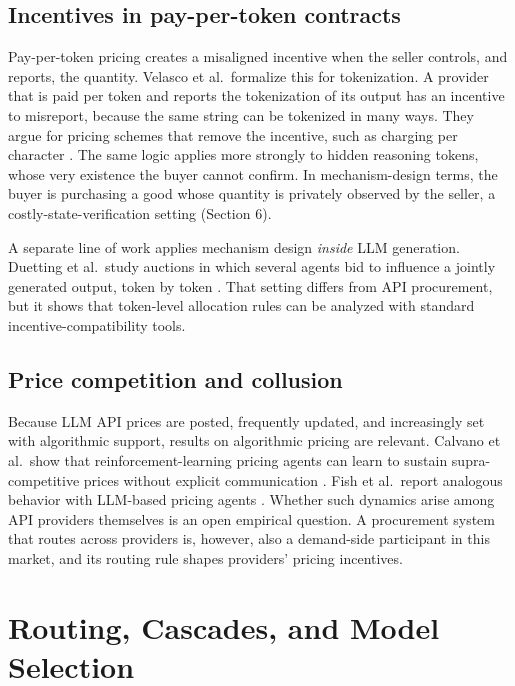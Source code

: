 \subsection{Incentives in pay-per-token contracts}\label{incentives-in-pay-per-token-contracts}

Pay-per-token pricing creates a misaligned incentive when the seller controls, and reports, the quantity. Velasco et al.~formalize this for tokenization. A provider that is paid per token and reports the tokenization of its output has an incentive to misreport, because the same string can be tokenized in many ways. They argue for pricing schemes that remove the incentive, such as charging per character \cite{velasco2025overcharging}. The same logic applies more strongly to hidden reasoning tokens, whose very existence the buyer cannot confirm. In mechanism-design terms, the buyer is purchasing a good whose quantity is privately observed by the seller, a costly-state-verification setting \cite{townsend1979csv} (Section 6).

A separate line of work applies mechanism design \emph{inside} LLM generation. Duetting et al.~study auctions in which several agents bid to influence a jointly generated output, token by token \cite{duetting2024mechanism}. That setting differs from API procurement, but it shows that token-level allocation rules can be analyzed with standard incentive-compatibility tools.

\subsection{Price competition and collusion}\label{price-competition-and-collusion}

Because LLM API prices are posted, frequently updated, and increasingly set with algorithmic support, results on algorithmic pricing are relevant. Calvano et al.~show that reinforcement-learning pricing agents can learn to sustain supra-competitive prices without explicit communication \cite{calvano2020collusion}. Fish et al.~report analogous behavior with LLM-based pricing agents \cite{fish2024collusion}. Whether such dynamics arise among API providers themselves is an open empirical question. A procurement system that routes across providers is, however, also a demand-side participant in this market, and its routing rule shapes providers' pricing incentives.

\section{Routing, Cascades, and Model Selection}\label{routing-cascades-and-model-selection}

